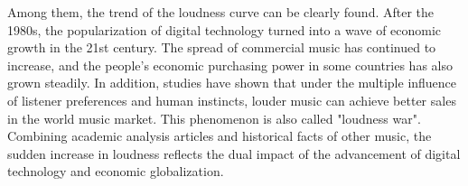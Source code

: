 \documentclass[12pt]{article}  %
\begin{document}
Among them, the trend of the loudness curve can be clearly found. After the 1980s, the popularization of digital technology turned into a wave of economic growth in the 21st century. The spread of commercial music has continued to increase, and the people's economic purchasing power in some countries has also grown steadily.\cite{held_globalizing_2004} In addition, studies have shown that under the multiple influence of listener preferences and human instincts, louder music can achieve better sales in the world music market. This phenomenon is also called "loudness war".\cite{vickers_loudness_2011} Combining academic analysis articles and historical facts of other music, the sudden increase in loudness reflects the dual impact of the advancement of digital technology and economic globalization.

\end{document}
